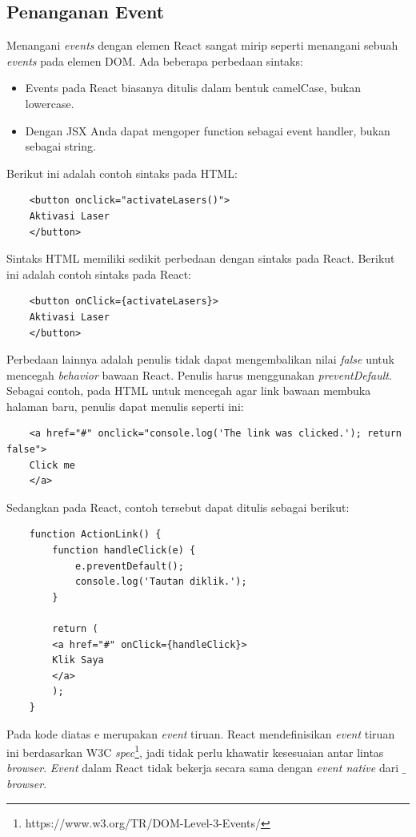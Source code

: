

\subsection{Penanganan Event}
Menangani \textit{events} dengan elemen React sangat mirip seperti menangani sebuah \textit{events} pada elemen DOM. Ada beberapa perbedaan sintaks:
\begin{itemize}
	\item Events pada React biasanya ditulis dalam bentuk camelCase, bukan lowercase.
	\item Dengan JSX Anda dapat mengoper function sebagai event handler, bukan sebagai string.
\end{itemize}
Berikut ini adalah contoh sintaks pada HTML:
\begin{lstlisting}
	<button onclick="activateLasers()">
	Aktivasi Laser
	</button>
\end{lstlisting}
Sintaks HTML memiliki sedikit perbedaan dengan sintaks pada React. Berikut ini adalah contoh sintaks pada React:
\begin{lstlisting}
	<button onClick={activateLasers}>
	Aktivasi Laser
	</button>
\end{lstlisting} 
Perbedaan lainnya adalah penulis tidak dapat mengembalikan nilai \textit{false} untuk mencegah \textit{behavior} bawaan React. Penulis harus menggunakan \textit{preventDefault}. Sebagai contoh, pada HTML untuk mencegah agar link bawaan membuka halaman baru, penulis dapat menulis seperti ini:  
\begin{lstlisting}
	<a href="#" onclick="console.log('The link was clicked.'); return false">
	Click me
	</a>
\end{lstlisting}
Sedangkan pada React, contoh tersebut dapat ditulis sebagai berikut:
\begin{lstlisting}
	function ActionLink() {
		function handleClick(e) {
			e.preventDefault();
			console.log('Tautan diklik.');
		}
		
		return (
		<a href="#" onClick={handleClick}>
		Klik Saya
		</a>
		);
	}
\end{lstlisting}
Pada kode diatas e merupakan \textit{event} tiruan. React mendefinisikan \textit{event} tiruan ini berdasarkan W3C \textit{spec}\footnote{https://www.w3.org/TR/DOM-Level-3-Events/}, jadi tidak perlu khawatir kesesuaian antar lintas \textit{browser}. \textit{Event} dalam React tidak bekerja secara sama dengan \textit{event native} dari $\_$\textit{browser}.
